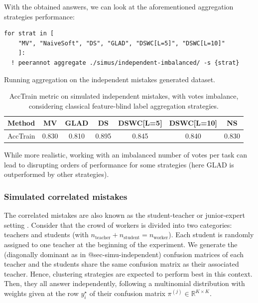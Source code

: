 With the obtained answers, we can look at the aforementioned aggregation strategies performance:

\begin{listing}[H]
    \begin{verbatim}
for strat in [
    "MV", "NaiveSoft", "DS", "GLAD", "DSWC[L=5]", "DSWC[L=10]"
    ]:
  ! peerannot aggregate ./simus/independent-imbalanced/ -s {strat}
    \end{verbatim}
    \caption{Running aggregation on the independent mistakes generated dataset.}
    \label{lst:indep_mistakes_agg_imbalance}
\end{listing}

\begin{table}[htbp]
    \centering
    \caption{AccTrain metric on simulated independent mistakes, with votes imbalance, considering classical feature-blind label aggregation strategies.}
    \label{tab:accuracy_train_indep}
    \begin{tabular}{|l|c|c|c|c|c|c|}
    \hline
    \textbf{Method} & \textbf{MV} & \textbf{GLAD} & \textbf{DS} & \textbf{DSWC[L=5]} & \textbf{DSWC[L=10]} & \textbf{NS} \\
    \hline
    AccTrain & 0.830 &	0.810 &	0.895 	&0.845& 	0.840 &	0.830\\
    \hline
    \end{tabular}
    \end{table}

While more realistic, working with an imbalanced number of votes per task can lead to disrupting orders of performance for some strategies (here GLAD is outperformed by other strategies).

\subsubsection{Simulated correlated mistakes}
The correlated mistakes are also known as the student-teacher or junior-expert setting \citep{maxmig}. Consider that the crowd of workers is divided into two categories: teachers and students (with $n_{\text{teacher}} + n_{\text{student}}=n_{\text{worker}}$). Each student is randomly assigned to one teacher at the beginning of the experiment. We generate the (diagonally dominant as in @sec-simu-independent) confusion matrices of each teacher and the students share the same confusion matrix as their associated teacher. Hence, clustering strategies are expected to perform best in this context. Then, they all answer independently, following a multinomial distribution with weights given at the row $y_i^\star$ of their confusion matrix $\pi^{(j)}\in\mathbb{R}^{K\times K}$.

